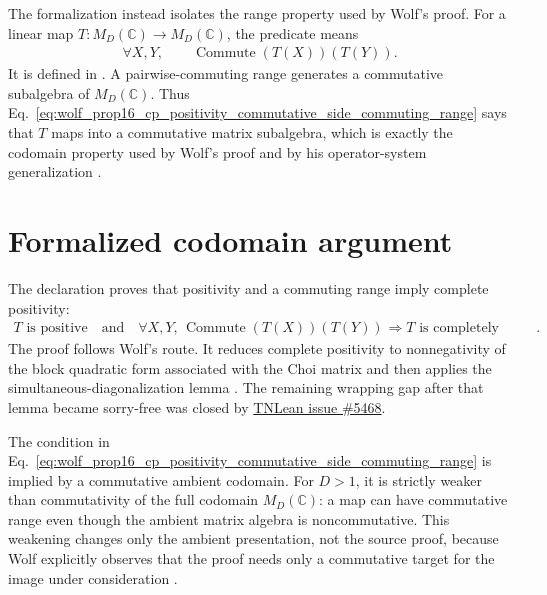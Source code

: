 \documentclass{article}
\begin{document}
The formalization instead isolates the range property used by Wolf's proof.
For a linear map $T:M_D(\mathbb C)\to M_D(\mathbb C)$, the predicate
 means
\begin{align}
    \forall X,Y,\qquad
    \operatorname{Commute}(T(X))(T(Y)).
    \label{eq:wolf_prop16_cp_positivity_commutative_side_commuting_range}
\end{align}
It is defined in
.
A pairwise-commuting range generates a commutative subalgebra of
$M_D(\mathbb C)$. Thus
Eq.~\ref{eq:wolf_prop16_cp_positivity_commutative_side_commuting_range} says
that $T$ maps into a commutative matrix subalgebra, which is exactly the
codomain property used by Wolf's proof and by his operator-system
generalization \cite[Proposition~1.6]{Wolf2012Quantum}.

\section{Formalized codomain argument}

The declaration
proves that positivity and a commuting range imply complete positivity:
\begin{align}
    T\text{ is positive}
    \quad\text{and}\quad
    \forall X,Y,\,
    \operatorname{Commute}(T(X))(T(Y))
        &\Longrightarrow T\text{ is completely positive}.
    \label{eq:wolf_prop16_cp_positivity_commutative_side_codomain_theorem}
\end{align}
The proof follows Wolf's route. It reduces complete positivity to
nonnegativity of the block quadratic form associated with the Choi matrix and
then applies the simultaneous-diagonalization lemma
.
The remaining wrapping gap after that lemma became sorry-free was closed by
\href{https://github.com/LionSR/TNLean/issues/5468}{TNLean issue \#5468}.

The condition in
Eq.~\ref{eq:wolf_prop16_cp_positivity_commutative_side_commuting_range} is
implied by a commutative ambient codomain. For $D>1$, it is strictly weaker
than commutativity of the full codomain $M_D(\mathbb C)$: a map can have
commutative range even though the ambient matrix algebra is noncommutative.
This weakening changes only the ambient presentation, not the source proof,
because Wolf explicitly observes that the proof needs only a commutative
target for the image under consideration
\cite[Proposition~1.6]{Wolf2012Quantum}.
\end{document}
